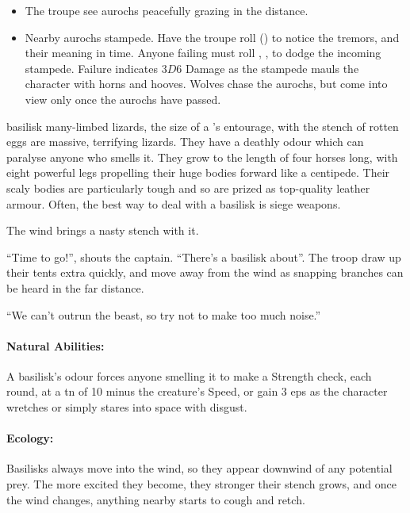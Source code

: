 \begin{multicols}{2}
\begin{itemize}
  \item
  The troupe see aurochs peacefully grazing in the distance.
  \item
  Nearby aurochs stampede.
  Have the troupe roll  (\tn[8]) to notice the tremors, and their meaning in time.
  Anyone failing must roll , \tn[9], to dodge the incoming stampede.
  Failure indicates $3D6$ Damage as the stampede mauls the character with horns and hooves.
  Wolves chase the aurochs, but come into view only once the aurochs have passed.

\end{itemize}

  {basilisk}%
  {many-limbed lizards, the size of a 's entourage, with the stench of rotten eggs}%
are massive, terrifying lizards.
They have a deathly odour which can paralyse anyone who smells it.
They grow to the length of four horses long, with eight powerful legs propelling their huge bodies forward like a centipede.
Their scaly bodies are particularly tough and so are prized as top-quality leather armour.
Often, the best way to deal with a basilisk is siege weapons.

\begin{boxtext}
  The wind brings a nasty stench with it.

  ``Time to go!'', shouts the captain.
  ``There's a basilisk about''.
  The troop draw up their tents extra quickly, and move away from the wind as snapping branches can be heard in the far distance.

  ``We can't outrun the beast, so try not to make too much noise.''
\end{boxtext}

\basilisk

\paragraph{Natural Abilities:} A basilisk's odour forces anyone smelling it to make a Strength check, each round, at a \gls{tn} of 10 minus the creature's Speed, or gain 3 \glspl{ep} as the character wretches or simply stares into space with disgust.

\paragraph{Ecology:}
Basilisks always move into the wind, so they appear downwind of any potential prey.
The more excited they become, they stronger their stench grows, and once the wind changes, anything nearby starts to cough and retch.


\end{multicols}
